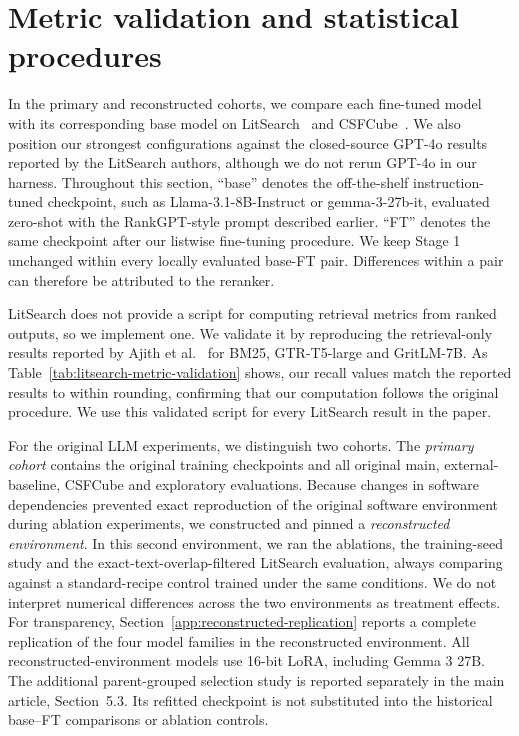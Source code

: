 \documentclass[pdflatex,sn-basic,Numbered]{sn-jnl}%
\theoremstyle{thmstyleone}%
\theoremstyle{thmstyletwo}%
\theoremstyle{thmstylethree}%
\begin{document}
\FloatBarrier
\section{Metric validation and statistical procedures}
\label{supp:metrics}

In the primary and reconstructed cohorts, we compare each fine-tuned model
with its corresponding base model on
LitSearch~\cite{Ajith} and CSFCube~\cite{Mysore}. We also position our strongest
configurations against the closed-source GPT-4o results reported by the LitSearch
authors, although we do not rerun GPT-4o in our harness. Throughout this section,
``base'' denotes the off-the-shelf instruction-tuned checkpoint, such as
Llama-3.1-8B-Instruct or gemma-3-27b-it, evaluated zero-shot with the
RankGPT-style prompt described earlier. ``FT'' denotes the same checkpoint after
our listwise fine-tuning procedure. We keep Stage 1 unchanged within every locally
evaluated base-FT pair. Differences within a pair can therefore be attributed to
the reranker.

LitSearch does not provide a script for computing retrieval metrics from ranked
outputs, so we implement one. We validate it by reproducing the retrieval-only
results reported by Ajith et al.~\cite{Ajith} for BM25, GTR-T5-large and
GritLM-7B. As Table~\ref{tab:litsearch-metric-validation} shows, our recall values
match the reported results to within rounding, confirming that our computation
follows the original procedure. We use this validated script for every LitSearch
result in the paper.

For the original LLM experiments, we distinguish two cohorts. The
\emph{primary cohort} contains
the original training checkpoints and all original main, external-baseline,
CSFCube and exploratory evaluations. Because changes in software dependencies prevented exact reproduction of the original software environment during ablation experiments, we constructed and pinned a \emph{reconstructed environment}. In this second environment, we ran
the ablations, the training-seed study and the exact-text-overlap-filtered
LitSearch evaluation, always comparing against a standard-recipe control trained
under the same conditions. We do not interpret numerical differences across the
two environments as treatment effects. For transparency,
Section~\ref{app:reconstructed-replication} reports a complete replication of the
four model families in the reconstructed environment. All reconstructed-environment
models use 16-bit LoRA, including Gemma 3 27B.
The additional parent-grouped selection study is reported separately in
the main article, Section~5.3. Its refitted checkpoint is not substituted into
the historical base--FT comparisons or ablation controls.
\end{document}
